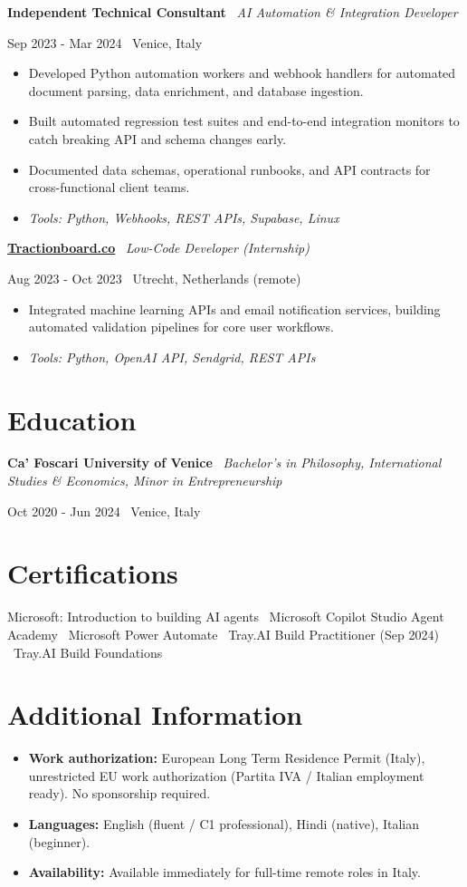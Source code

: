 \documentclass[a4paper,10pt]{article}
\newcommand{\role}[4]{%
 \vspace{2pt}\noindent
 \begin{minipage}[t]{0.70\textwidth}\raggedright\textbf{#1} \textbullet\ \textit{#3}\end{minipage}%
 \hfill
 \begin{minipage}[t]{0.28\textwidth}\raggedleft\footnotesize\color{gray}#2 \textbullet\ #4\end{minipage}%
 \vspace{1pt}%
}
\begin{document}
\role{Independent Technical Consultant}{Sep 2023 - Mar 2024}{AI Automation \& Integration Developer}{Venice, Italy}
\begin{itemize}
 \item Developed Python automation workers and webhook handlers for automated document parsing, data enrichment, and database ingestion.
 \item Built automated regression test suites and end-to-end integration monitors to catch breaking API and schema changes early.
 \item Documented data schemas, operational runbooks, and API contracts for cross-functional client teams.
 \item \textit{Tools: Python, Webhooks, REST APIs, Supabase, Linux}
\end{itemize}

\role{\href{https://tractionboard.co}{Tractionboard.co}}{Aug 2023 - Oct 2023}{Low-Code Developer (Internship)}{Utrecht, Netherlands (remote)}
\begin{itemize}
 \item Integrated machine learning APIs and email notification services, building automated validation pipelines for core user workflows.
 \item \textit{Tools: Python, OpenAI API, Sendgrid, REST APIs}
\end{itemize}

\section{Education}
\role{Ca' Foscari University of Venice}{Oct 2020 - Jun 2024}{Bachelor's in Philosophy, International Studies \& Economics, Minor in Entrepreneurship}{Venice, Italy}

\section{Certifications}
Microsoft: Introduction to building AI agents \textbullet\ Microsoft Copilot Studio Agent Academy \textbullet\ Microsoft Power Automate \textbullet\ Tray.AI Build Practitioner (Sep 2024) \textbullet\ Tray.AI Build Foundations

\section{Additional Information}
\begin{itemize}
 \item \textbf{Work authorization:} European Long Term Residence Permit (Italy), unrestricted EU work authorization (Partita IVA / Italian employment ready). No sponsorship required.
 \item \textbf{Languages:} English (fluent / C1 professional), Hindi (native), Italian (beginner).
 \item \textbf{Availability:} Available immediately for full-time remote roles in Italy.
\end{itemize}
\end{document}
